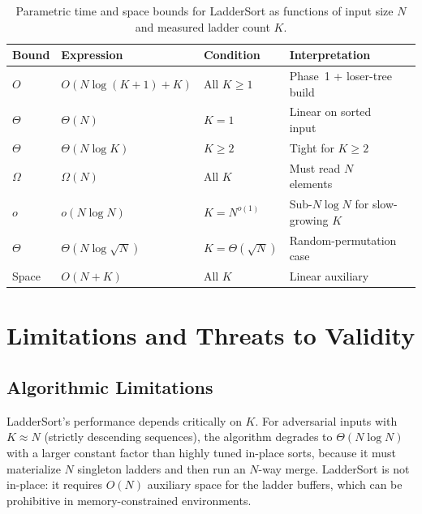 \documentclass[12pt,a4paper]{article}
\theoremstyle{plain}
\theoremstyle{definition}
\begin{document}
\begin{table}[H]
\centering\small
\caption{Parametric time and space bounds for LadderSort as functions of
  input size $N$ and measured ladder count $K$.}
\label{tab:parametric-bounds}
\begin{tabularx}{\linewidth}{@{}llllX@{}}
\toprule
Bound & Expression & Condition & Interpretation \\
\midrule
$O$        & $O(N\log(K+1) + K)$ & All $K \ge 1$       & Phase~1 + loser-tree build \\
$\Theta$   & $\Theta(N)$              & $K = 1$             & Linear on sorted input \\
$\Theta$   & $\Theta(N\log K)$        & $K \ge 2$           & Tight for $K \ge 2$ \\
$\Omega$   & $\Omega(N)$              & All $K$             & Must read $N$ elements \\
$o$        & $o(N\log N)$             & $K = N^{o(1)}$      & Sub-$N\log N$ for slow-growing $K$ \\
$\Theta$   & $\Theta(N\log\sqrt{N})$  & $K=\Theta(\sqrt{N})$& Random-permutation case \\
Space      & $O(N + K)$               & All $K$             & Linear auxiliary \\
\bottomrule
\end{tabularx}
\end{table}

\section{Limitations and Threats to Validity}
\label{sec:limits}

\subsection{Algorithmic Limitations}

LadderSort's performance depends critically on $K$.  For adversarial inputs
with $K \approx N$ (strictly descending sequences), the algorithm degrades to
$\Theta(N\log N)$ with a larger constant factor than highly tuned in-place
sorts, because it must materialize $N$ singleton ladders and then run an
$N$-way merge.  LadderSort is not in-place: it requires $O(N)$ auxiliary
space for the ladder buffers, which can be prohibitive in memory-constrained
environments.
\end{document}
